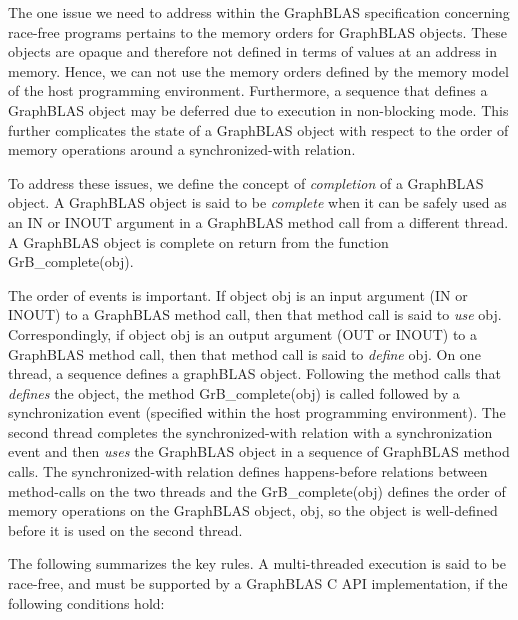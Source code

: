 The one issue we need to address within the GraphBLAS specification concerning race-free programs
pertains to the memory orders for GraphBLAS objects.  These objects are opaque and therefore not defined 
in terms of values at an address in memory.  
Hence, we can not use the memory orders defined
by the memory model of the host programming environment.   Furthermore, a sequence
that defines a GraphBLAS object may be deferred due to execution in non-blocking mode.
This further complicates the state of a GraphBLAS object with respect to the 
order of memory operations around a synchronized-with relation.

To address these issues, we define the concept of \emph{completion} of 
a GraphBLAS object.  A GraphBLAS object is said to be 
\emph{complete} when it can be
safely used as an {\sf IN} or {\sf INOUT} argument in a 
GraphBLAS method call from a different thread.  A GraphBLAS
object is complete on return from the function {\sf GrB\_complete(obj)}.

The order of events is important.  
If object {\sf obj} is an input argument ({\sf IN} or {\sf INOUT})
to a GraphBLAS method call, then that method call is said to
\emph{use} {\sf obj}. Correspondingly, if object {\sf obj} is
an output argument ({\sf OUT} or {\sf INOUT})
to a GraphBLAS method call, then that method call is said
to \emph{define} {\sf obj.}    
On one thread, a sequence defines
a graphBLAS object.   Following the method calls that \emph{defines} the object,
the method {\sf GrB\_complete(obj)} is called followed by a
synchronization event (specified within the host programming environment).  
The second thread completes the synchronized-with relation with a synchronization
event and then \emph{uses} the GraphBLAS object in a sequence of 
GraphBLAS method calls.    The synchronized-with relation defines happens-before
relations between method-calls on the two threads and the {\sf GrB\_complete(obj)}
defines the order of memory operations on the GraphBLAS object, {\sf obj}, so the object
is well-defined before it is used on the second thread.

The following summarizes the key rules.  A multi-threaded execution is said to be race-free, and must
be supported by a GraphBLAS C API implementation, if the following
conditions hold:

